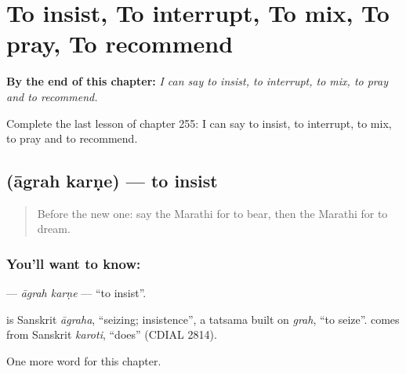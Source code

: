 
\chapter{To insist, To interrupt, To mix, To pray, To recommend}
\label{ch:mr-to-insist-to-interrupt-to-mix-to-pray-to-recommend}

\begin{chapteropening}
\textbf{By the end of this chapter:} \emph{I can say to insist, to interrupt, to mix, to pray and to recommend.}

Complete the last lesson of chapter 255: I can say to insist, to interrupt, to mix, to pray and to recommend.
\end{chapteropening}

\section[\texorpdfstring{\mr{आग्रह} \mr{करणे} (āgrah karṇe)}{आग्रह करणे (āgrah karṇe)}]{  (āgrah karṇe) — to insist}

\label{lesson:MR-C255-agrah-karne}



\begin{quote}
Before the new one: say the Marathi for to bear, then the Marathi for to dream.
\end{quote}

\subsection*{You'll want to know:  }
\textbf{ } — \emph{āgrah karṇe} — \textquotedblleft{}to insist\textquotedblright{}.

\begin{cousinweb}
\textbf{} is Sanskrit \emph{āgraha}, \textquotedblleft{}seizing; insistence\textquotedblright{}, a tatsama built on \emph{grah}, \textquotedblleft{}to seize\textquotedblright{}. \textbf{} comes from Sanskrit \emph{karoti}, \textquotedblleft{}does\textquotedblright{} (CDIAL 2814).
\end{cousinweb}

\begin{grammarlens}[title={What you've built}]
One more word for this chapter.
\end{grammarlens}

